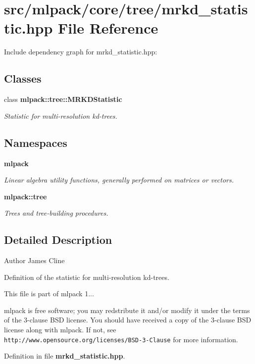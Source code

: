 \section{src/mlpack/core/tree/mrkd\-\_\-statistic.hpp File Reference}
\label{mrkd__statistic_8hpp}
Include dependency graph for mrkd\-\_\-statistic.\-hpp\-:
\subsection*{Classes}
\begin{DoxyCompactItemize}
\item 
class {\bf mlpack\-::tree\-::\-M\-R\-K\-D\-Statistic}
\begin{DoxyCompactList}\small\item\em Statistic for multi-\/resolution kd-\/trees. \end{DoxyCompactList}\end{DoxyCompactItemize}
\subsection*{Namespaces}
\begin{DoxyCompactItemize}
\item 
{\bf mlpack}
\begin{DoxyCompactList}\small\item\em Linear algebra utility functions, generally performed on matrices or vectors. \end{DoxyCompactList}\item 
{\bf mlpack\-::tree}
\begin{DoxyCompactList}\small\item\em Trees and tree-\/building procedures. \end{DoxyCompactList}\end{DoxyCompactItemize}


\subsection{Detailed Description}
\begin{DoxyAuthor}{Author}
James Cline
\end{DoxyAuthor}
Definition of the statistic for multi-\/resolution kd-\/trees.

This file is part of mlpack 1...

mlpack is free software; you may redstribute it and/or modify it under the terms of the 3-\/clause B\-S\-D license. You should have received a copy of the 3-\/clause B\-S\-D license along with mlpack. If not, see {\tt http\-://www.\-opensource.\-org/licenses/\-B\-S\-D-\/3-\/\-Clause} for more information. 

Definition in file {\bf mrkd\-\_\-statistic.\-hpp}.

